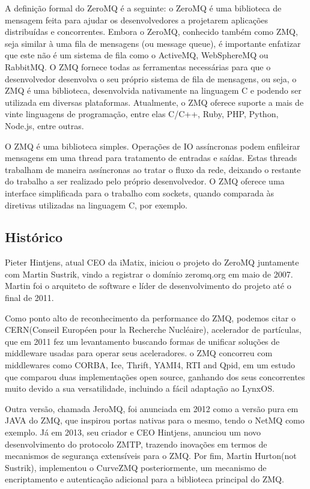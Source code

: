 \documentclass[12pt]{article}
\begin{document}
	A definição formal do ZeroMQ é a seguinte: o ZeroMQ é uma biblioteca de mensagem feita para ajudar os desenvolvedores a projetarem aplicações distribuídas e concorrentes. Embora o ZeroMQ, conhecido também como ZMQ, seja similar à uma fila de mensagens (ou message queue), é importante enfatizar que este não é um sistema de fila como o ActiveMQ, WebSphereMQ ou RabbitMQ. O ZMQ fornece todas as ferramentas necessárias para que o desenvolvedor desenvolva o seu próprio sistema de fila de mensagens, ou seja, o ZMQ é uma biblioteca, desenvolvida nativamente na linguagem C e podendo ser utilizada em diversas plataformas. Atualmente, o ZMQ oferece suporte a mais de vinte linguagens de programação, entre elas C/C++, Ruby, PHP, Python, Node.js, entre outras.

	O ZMQ é uma biblioteca simples. Operações de IO assíncronas podem enfileirar mensagens em uma thread para tratamento de entradas e saídas. Estas threads trabalham de maneira assíncronas ao tratar o fluxo da rede, deixando o restante do trabalho a ser realizado pelo próprio desenvolvedor. O ZMQ oferece uma interface simplificada para o trabalho com sockets, quando comparada às diretivas utilizadas na linguagem C, por exemplo.

\subsection{Histórico}
	Pieter Hintjens, atual CEO da iMatix, iniciou o projeto do ZeroMQ juntamente com Martin Sustrik, vindo a registrar o domínio zeromq.org em maio de 2007. Martin foi o arquiteto de software e líder de desenvolvimento do projeto até o final de 2011. 

	Como ponto alto de reconhecimento da performance do ZMQ, podemos citar o CERN(Conseil Européen pour la Recherche Nucléaire), acelerador de partículas, que em 2011 fez um levantamento buscando formas de unificar soluções de middleware usadas para operar seus aceleradores. o ZMQ concorreu com middlewares como CORBA, Ice, Thrift, YAMI4, RTI and Qpid, em um estudo que comparou duas implementações open source, ganhando dos seus concorrentes muito devido a sua versatilidade, incluindo a fácil adaptação ao LynxOS.

	Outra versão, chamada JeroMQ, foi anunciada em 2012 como a versão pura em JAVA do ZMQ, que inspirou portas nativas para o mesmo, tendo o NetMQ como exemplo. Já em 2013, seu criador e CEO Hintjens, anunciou um novo desenvolvimento do protocolo ZMTP, trazendo inovações em termos de mecanismos de segurança extensíveis para o ZMQ. Por fim, Martin Hurton(not Sustrik), implementou o CurveZMQ posteriormente, um mecanismo de encriptamento e autenticação adicional para a biblioteca principal do ZMQ.
\end{document}
